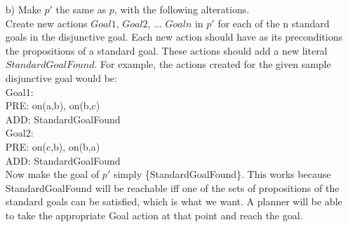 \documentclass{article}
\begin{document}
\begin{enumerate}
\begin{enumerate}
\item[b)]
Make $p'$ the same as $p$, with the following alterations.\\
\vspace{6pt}
Create new actions $Goal1$, $Goal2$, ... $Goaln$ in $p'$ for each of the n
standard goals in the disjunctive goal. Each new action should have as its
preconditions the propositions of a standard goal. These actions should add a
new literal $StandardGoalFound$. For example, the actions created for the
given sample disjunctive goal would be:\\
\vspace{2pt}
Goal1:\\
PRE: {on(a,b), on(b,c)}\\
ADD: StandardGoalFound\\
\vspace{2pt}
Goal2:\\
PRE: {on(c,b), on(b,a)}\\
ADD: StandardGoalFound\\
\vspace{6pt}
Now make the goal of $p'$ simply \{StandardGoalFound\}. This works because
StandardGoalFound will be reachable iff one of the sets of propositions
of the standard goals can be satisfied, which is what we want. A planner will
be able to take the appropriate Goal action at that point and reach the goal.

\end{enumerate}

\end{enumerate}
\end{document}
